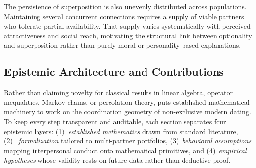 The persistence of superposition is also unevenly distributed across populations.
Maintaining several concurrent connections requires a supply of viable partners
who tolerate partial availability. That supply varies systematically with
perceived attractiveness and social reach, motivating the structural link between
optionality and superposition rather than purely moral or personality-based
explanations.

\subsection{Epistemic Architecture and Contributions}
\label{subsec:intro-contributions}

Rather than claiming novelty for classical results in linear algebra, operator
inequalities, Markov chains, or percolation theory, \RST{} puts established
mathematical machinery to work on the coordination geometry of non-exclusive modern
dating. To keep every step transparent and auditable, each section separates four
epistemic layers: (1)~\emph{established mathematics} drawn from standard literature,
(2)~\emph{\RST{} formalization} tailored to multi-partner portfolios,
(3)~\emph{behavioral assumptions} mapping interpersonal conduct onto mathematical
primitives, and (4)~\emph{empirical hypotheses} whose validity rests on future data
rather than deductive proof.

